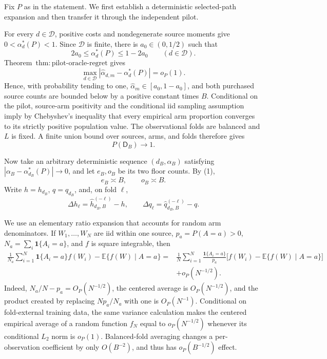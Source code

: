 Fix \(P\) as in the statement.  We first establish a deterministic selected-path expansion and then transfer it through the independent pilot.

For every \(d\in\mathcal D\), positive costs and nondegenerate source moments give \(0<\alpha_d^*(P)<1\).  Since \(\mathcal D\) is finite, there is \(a_0\in(0,1/2)\) such that
\[
 2a_0\le\alpha_d^*(P)\le1-2a_0
 \qquad(d\in\mathcal D).                                  \tag{1}
\]
Theorem~\(\mathrm{thm{:}pilot\text{-}oracle\text{-}regret}\) gives
\[
 \max_{d\in\mathcal D}
 |\widehat\alpha_{d,m}-\alpha_d^*(P)|=o_P(1).              \tag{2}
\]
Hence, with probability tending to one, \(\widehat\alpha_m\in[a_0,1-a_0]\), and both purchased source counts are bounded below by a positive constant times \(B\).  Conditional on the pilot, source-arm positivity and the conditional iid sampling assumption imply by Chebyshev's inequality that every empirical arm proportion converges to its strictly positive population value.  The observational folds are balanced and \(L\) is fixed.  A finite union bound over sources, arms, and folds therefore gives
\[
 P(\mathsf D_B)\longrightarrow1.                          \tag{3}
\]

Now take an arbitrary deterministic sequence \((d_B,\alpha_B)\) satisfying \(|\alpha_B-\alpha_{d_B}^*(P)|\to0\), and let \(e_B,o_B\) be its two floor counts.  By (1),
\[
 e_B\asymp B,
 \qquad
 o_B\asymp B.                                             \tag{4}
\]
Write \(h=h_{d_B}\), \(q=q_{d_B}\), and, on fold \(\ell\),
\[
 \Delta h_\ell=\widehat h_{d_B,B}^{(-\ell)}-h,
 \qquad
 \Delta q_\ell=\widehat q_{d_B,B}^{(-\ell)}-q.
\]

We use an elementary ratio expansion that accounts for random arm denominators.  If \(W_1,\ldots,W_N\) are iid within one source, \(p_a=P(A=a)>0\), \(N_a=\sum_i\mathbf1\{A_i=a\}\), and \(f\) is square integrable, then
\[
\begin{aligned}
 \frac1{N_a}\sum_{i=1}^N\mathbf1\{A_i=a\}f(W_i)
 -\mathbb E\{f(W)\mid A=a\}
 ={}&\frac1N\sum_{i=1}^N\frac{\mathbf1\{A_i=a\}}{p_a}
 \bigl[f(W_i)-\mathbb E\{f(W)\mid A=a\}\bigr]\\
 &+o_P(N^{-1/2}).                                         \tag{5}
\end{aligned}
\]
Indeed, \(N_a/N-p_a=O_P(N^{-1/2})\), the centered average is \(O_P(N^{-1/2})\), and the product created by replacing \(Np_a/N_a\) with one is \(O_P(N^{-1})\).  Conditional on fold-external training data, the same variance calculation makes the centered empirical average of a random function \(f_N\) equal to \(o_P(N^{-1/2})\) whenever its conditional \(L_2\) norm is \(o_P(1)\).  Balanced-fold averaging changes a per-observation coefficient by only \(O(B^{-2})\), and thus has \(o_P(B^{-1/2})\) effect.

